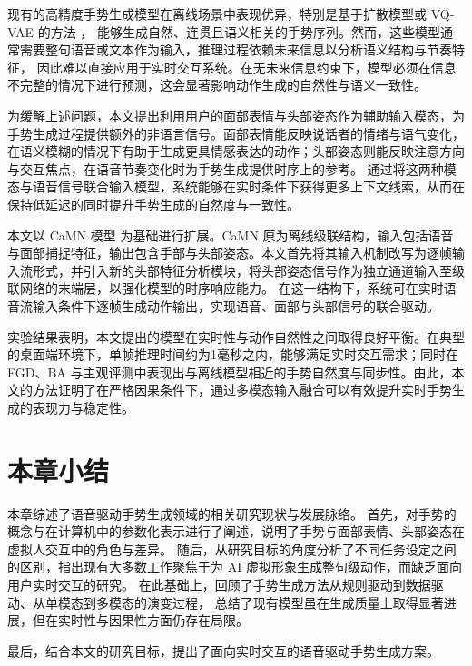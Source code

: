 现有的高精度手势生成模型在离线场景中表现优异，特别是基于扩散模型或 VQ-VAE 的方法 \cite{tamingDiffgesture, diffsheg, emage, DiffTED2024}， 能够生成自然、连贯且语义相关的手势序列。然而，这些模型通常需要整句语音或文本作为输入，推理过程依赖未来信息以分析语义结构与节奏特征，  
因此难以直接应用于实时交互系统。在无未来信息约束下，模型必须在信息不完整的情况下进行预测，这会显著影响动作生成的自然性与语义一致性。

为缓解上述问题，本文提出利用用户的面部表情与头部姿态作为辅助输入模态，为手势生成过程提供额外的非语言信号。面部表情能反映说话者的情绪与语气变化，在语义模糊的情况下有助于生成更具情感表达的动作；头部姿态则能反映注意方向与交互焦点，在语音节奏变化时为手势生成提供时序上的参考。  
通过将这两种模态与语音信号联合输入模型，系统能够在实时条件下获得更多上下文线索，从而在保持低延迟的同时提升手势生成的自然度与一致性。

本文以 CaMN 模型 \cite{beatcamn} 为基础进行扩展。CaMN 原为离线级联结构，输入包括语音与面部捕捉特征，输出包含手部与头部姿态。本文首先将其输入机制改写为逐帧输入流形式，并引入新的头部特征分析模块，将头部姿态信号作为独立通道输入至级联网络的末端层，以强化模型的时序响应能力。  
在这一结构下，系统可在实时语音流输入条件下逐帧生成动作输出，实现语音、面部与头部信号的联合驱动。

实验结果表明，本文提出的模型在实时性与动作自然性之间取得良好平衡。在典型的桌面端环境下，单帧推理时间约为1毫秒之内，能够满足实时交互需求；同时在 FGD、BA 与主观评测中表现出与离线模型相近的手势自然度与同步性。由此，本文的方法证明了在严格因果条件下，通过多模态输入融合可以有效提升实时手势生成的表现力与稳定性。

\section{本章小结}
本章综述了语音驱动手势生成领域的相关研究现状与发展脉络。  
首先，对手势的概念与在计算机中的参数化表示进行了阐述，说明了手势与面部表情、头部姿态在虚拟人交互中的角色与差异。  
随后，从研究目标的角度分析了不同任务设定之间的区别，指出现有大多数工作聚焦于为 AI 虚拟形象生成整句级动作，而缺乏面向用户实时交互的研究。  
在此基础上，回顾了手势生成方法从规则驱动到数据驱动、从单模态到多模态的演变过程，  
总结了现有模型虽在生成质量上取得显著进展，但在实时性与因果性方面仍存在局限。

最后，结合本文的研究目标，提出了面向实时交互的语音驱动手势生成方案。


